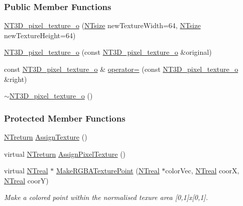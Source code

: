 \subsubsection*{Public Member Functions}
\begin{DoxyCompactItemize}
\item 
\hyperlink{class_n_t3_d__pixel__texture__o_a8f524d7096a7e1a131a9506edca0d04f}{NT3D\_\-pixel\_\-texture\_\-o} (\hyperlink{nt__types_8h_a06c124f2e4469769b58230253ce0560b}{NTsize} newTextureWidth=64, \hyperlink{nt__types_8h_a06c124f2e4469769b58230253ce0560b}{NTsize} newTextureHeight=64)
\item 
\hyperlink{class_n_t3_d__pixel__texture__o_a4bcdea143205ab2e12b8aa3552b4c32f}{NT3D\_\-pixel\_\-texture\_\-o} (const \hyperlink{class_n_t3_d__pixel__texture__o}{NT3D\_\-pixel\_\-texture\_\-o} \&original)
\item 
const \hyperlink{class_n_t3_d__pixel__texture__o}{NT3D\_\-pixel\_\-texture\_\-o} \& \hyperlink{class_n_t3_d__pixel__texture__o_ac6e4d1b0b24bffd5e751aae0615c6254}{operator=} (const \hyperlink{class_n_t3_d__pixel__texture__o}{NT3D\_\-pixel\_\-texture\_\-o} \&right)
\item 
\hyperlink{class_n_t3_d__pixel__texture__o_a89353b221ef5346ecb0280e55bc7cce8}{$\sim$NT3D\_\-pixel\_\-texture\_\-o} ()
\end{DoxyCompactItemize}
\subsubsection*{Protected Member Functions}
\begin{DoxyCompactItemize}
\item 
\hyperlink{nt__types_8h_ab9564ee8f091e809d21b8451c6683c53}{NTreturn} \hyperlink{class_n_t3_d__pixel__texture__o_ab9ec73dbdadef9b90fbcf4efb8bca445}{AssignTexture} ()
\item 
virtual \hyperlink{nt__types_8h_ab9564ee8f091e809d21b8451c6683c53}{NTreturn} \hyperlink{class_n_t3_d__pixel__texture__o_adaa5dd7f601de9992061fb63b9daa892}{AssignPixelTexture} ()
\item 
virtual \hyperlink{nt__types_8h_a814a97893e9deb1eedcc7604529ba80d}{NTreal} $\ast$ \hyperlink{class_n_t3_d__pixel__texture__o_a1b849b722c98255782097a02114b98c4}{MakeRGBATexturePoint} (\hyperlink{nt__types_8h_a814a97893e9deb1eedcc7604529ba80d}{NTreal} $\ast$colorVec, \hyperlink{nt__types_8h_a814a97893e9deb1eedcc7604529ba80d}{NTreal} coorX, \hyperlink{nt__types_8h_a814a97893e9deb1eedcc7604529ba80d}{NTreal} coorY)
\begin{DoxyCompactList}\small\item\em Make a colored point within the normalised texure area \mbox{[}0,1\mbox{]}x\mbox{[}0,1\mbox{]}. \item\end{DoxyCompactList}\end{DoxyCompactItemize}


